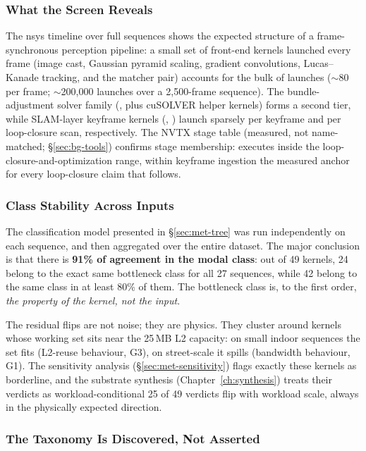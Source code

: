 \subsubsection{What the Screen Reveals}

The nsys timeline over full sequences shows the expected structure of a frame-synchronous perception pipeline: a small set of front-end kernels launched every frame (image cast, Gaussian pyramid scaling, gradient convolutions, Lucas--Kanade tracking, and the matcher pair) accounts for the bulk of launches ($\sim$80 per frame; $\sim$200{,}000 launches over a 2{,}500-frame sequence). The bundle-adjustment solver family (, plus cuSOLVER helper kernels) forms a second tier, while SLAM-layer keyframe kernels (\stBuild{}, \stTrack{}) launch sparsely per keyframe and per loop-closure scan, respectively. The NVTX stage table (measured, not name-matched; \S\ref{sec:bg-tools}) confirms stage membership: \stTrack{} executes inside the loop-closure-and-optimization range, \stBuild{} within keyframe ingestion the measured anchor for every loop-closure claim that follows.

\subsubsection{Class Stability Across Inputs}
\label{sec:char-stability}

The classification model presented in \S\ref{sec:met-tree} was run independently on each sequence, and then aggregated over the entire dataset. The major conclusion is that there is \textbf{91\% of agreement in the modal class}: out of 49 kernels, 24 belong to the exact same bottleneck class for all 27 sequences, while 42 belong to the same class in at least 80\% of them. The bottleneck class is, to the first order, \emph{the property of the kernel, not the input}.

The residual flips are not noise; they are physics. They cluster around kernels whose working set sits near the 25\,MB L2 capacity: on small indoor sequences the set fits (L2-reuse behaviour, G3), on street-scale it spills (bandwidth behaviour, G1). The sensitivity analysis (\S\ref{sec:met-sensitivity}) flags exactly these kernels as borderline, and the substrate synthesis (Chapter~\ref{ch:synthesis}) treats their verdicts as workload-conditional 25 of 49 verdicts flip with workload scale, always in the physically expected direction.

\subsubsection{The Taxonomy Is Discovered, Not Asserted}
\label{sec:char-clustering}

